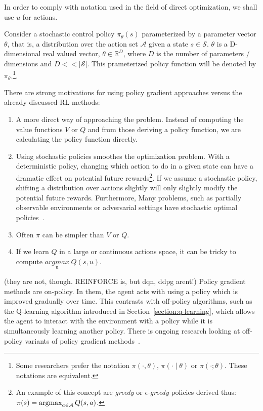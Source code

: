 \documentclass{../main.tex}{subfiles}
\begin{document}
In order to comply with notation used in the field of direct optimization, we shall use $u$ for actions.

Consider a stochastic control policy  $\pi_{\theta}(s)$ parameterized by a parameter vector $\theta$, that is, a distribution over the action set $\mathcal{A}$ given a state $s \in \mathcal{S}$. $\theta$ is a D-dimensional real valued vector,  $\theta \in \mathbb{R}^{D}$, where $D$ is the number of parameters / dimensions and $D << |\mathcal{S}|$. This prameterized policy function will be denoted by $\pi_{\theta}$.\footnote{Some researchers prefer the notation $\pi(\cdot, \theta)$, $\pi(\cdot \mid \theta)$ or $\pi(\cdot; \theta)$. These notations are equivalent.}. 

There are strong motivations for using policy gradient approaches versus the already discussed RL methods:
\begin{enumerate}
\item A more direct way of approaching the problem. Instead of computing the value functions $V$ or $Q$ and from those deriving a policy function, we are calculating the policy function directly.
\item Using stochastic policies smoothes the optimization problem. With a deterministic policy, changing which action to do in a given state can have a dramatic effect on potential future rewards\footnote{An example of this concept are \textit{greedy} or $\epsilon$-\textit{greedy} policies derived thus: $\pi(s) = \operatorname*{argmax}_{a \in \mathcal{A}} Q(s,a)$.}. If we assume a stochastic policy, shifting a distribution over actions slightly will only slightly modify the potential future rewards. Furthermore, Many problems, such as partially observable environments or adversarial settings have stochastic optimal policies~\citep{Degris2012}.
\item Often $\pi$ can be simpler than $V$ or $Q$.
\item If we learn $Q$ in a large or continuous actions space, it can be tricky to compute $\underset{\text{u}}{argmax}\; Q(s,u)$.
\end{enumerate}
 
(they are not, though. REINFORCE is, but dqn, ddpg arent!) Policy gradient methods are on-policy. In them, the agent acts with using a policy which is improved gradually over time. This contrasts with off-policy algorithms, such as the Q-learning algorithm introduced in Section~\ref{section:q-learning}, which allows the agent to interact with the environment with a policy while it is simultaneously learning another policy. There is ongoing research looking at off-policy variants of policy gradient methods~\citep{Mnih2013, Mnih2016}. 
\end{document}
